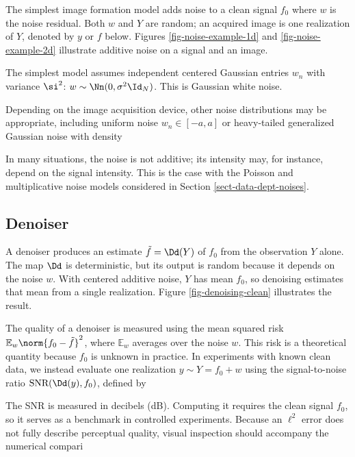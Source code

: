 The simplest image formation model adds noise to a clean signal $f_0$
where $w$ is the noise residual. Both $w$ and $Y$ are random; an acquired image is one realization of $Y$, denoted by $y$ or $f$ below. Figures \ref{fig-noise-example-1d} and \ref{fig-noise-example-2d} illustrate additive noise on a signal and an image.




The simplest model assumes independent centered Gaussian entries $w_n$ with variance $\si^2$: $w\sim\Nn(0,\sigma^2\Id_N)$. This is Gaussian white noise.

Depending on the image acquisition device, other noise distributions may be appropriate, including uniform noise $w_n \in [-a,a]$ or heavy-tailed generalized Gaussian noise with density

In many situations, the noise is not additive; its intensity may, for instance, depend on the signal intensity. This is the case with the Poisson and multiplicative noise models considered in Section \ref{sect-data-dept-noises}.


                                                     
\subsection{Denoiser}

A denoiser produces an estimate $\tilde f = \Dd(Y)$ of $f_0$ from the observation $Y$ alone. The map $\Dd$ is deterministic, but its output is random because it depends on the noise $w$. With centered additive noise, $Y$ has mean $f_0$, so denoising estimates that mean from a single realization. Figure \ref{fig-denoising-clean} illustrates the result.

The quality of a denoiser is measured using the mean squared risk $\mathbb E_w\norm{f_0-\tilde f}^2$,
where $\mathbb E_w$ averages over the noise $w$. This risk is a theoretical quantity because $f_0$ is unknown in practice. In experiments with known clean data, we instead evaluate one realization $y \sim Y = f_0 + w$ using the signal-to-noise ratio $\text{SNR}(\Dd(y),f_0)$, defined by
 
The SNR is measured in decibels (dB). Computing it requires the clean signal $f_0$, so it serves as a benchmark in controlled experiments. Because an $\ell^2$ error does not fully describe perceptual quality, visual inspection should accompany the numerical compari